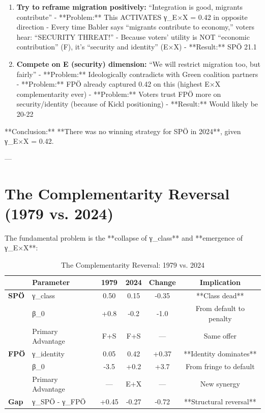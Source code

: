 {{{{{{{{\begin{enumerate}
\item \textbf{Try to reframe migration positively:} ``Integration is good, migrants contribute''
   - **Problem:** This ACTIVATES γ_{E×X} = 0.42 in opposite direction
   - Every time Babler says ``migrants contribute to economy,'' voters hear: ``SECURITY THREAT!''
   - Because voters' utility is NOT ``economic contribution'' (F), it's ``security and identity'' (E×X)
   - **Result:** SPÖ 21.1%

\item \textbf{Compete on E (security) dimension:} ``We will restrict migration too, but fairly''
   - **Problem:** Ideologically contradicts with Green coalition partners
   - **Problem:** FPÖ already captured 0.42 on this (highest E×X complementarity ever)
   - **Problem:** Voters trust FPÖ more on security/identity (because of Kickl positioning)
   - **Result:** Would likely be 20-22%

\end{enumerate}

**Conclusion:** **There was no winning strategy for SPÖ in 2024**, given γ_{E×X} = 0.42.

---

\section{The Complementarity Reversal (1979 vs. 2024)}
\label{sec:class-collapse}

The fundamental problem is the **collapse of γ_class** and **emergence of γ_{E×X}**:

\begin{table}[h]
\centering
\caption{The Complementarity Reversal: 1979 vs. 2024}
\label{tab:complementarity-reversal}
\small
\begin{tabular}{llcccc}
\toprule
& Parameter & 1979 & 2024 & Change & Implication \\
\midrule
\textbf{SPÖ} & γ_class & 0.50 & 0.15 & -0.35 & **Class dead** \\
& β_0 & +0.8 & -0.2 & -1.0 & From default to penalty \\
& Primary Advantage & F+S & F+S & — & Same offer \\
\midrule
\textbf{FPÖ} & γ_{identity} & 0.05 & 0.42 & +0.37 & **Identity dominates** \\
& β_0 & -3.5 & +0.2 & +3.7 & From fringe to default \\
& Primary Advantage & — & E+X & — & New synergy \\
\midrule
\textbf{Gap} & γ_SPÖ - γ_FPÖ & +0.45 & -0.27 & -0.72 & **Structural reversal** \\
\bottomrule
\end{tabular}
\end{table}

}}}}}}}}
